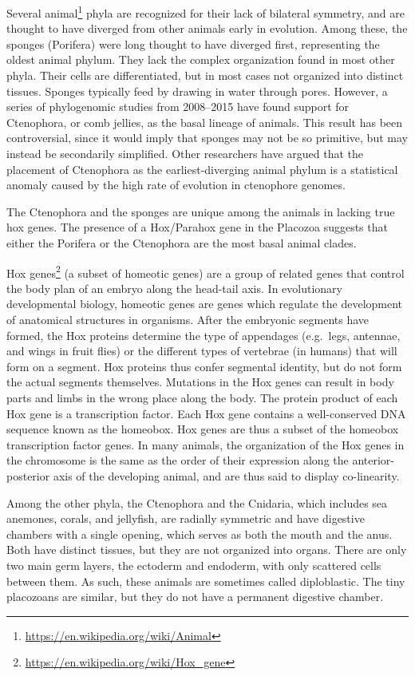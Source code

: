 \documentclass[]{book}
\let\rmarkdownfootnote\footnote%
\def\footnote{\protect\rmarkdownfootnote}
\renewcommand{\href}[2]{#2\footnote{\url{#1}}}
\theoremstyle{definition}
\theoremstyle{definition}
\theoremstyle{definition}
\theoremstyle{remark}
\begin{document}
\begin{enumerate}
Several \href{https://en.wikipedia.org/wiki/Animal}{animal} phyla are
recognized for their lack of bilateral symmetry, and are thought to have
diverged from other animals early in evolution. Among these, the sponges
(Porifera) were long thought to have diverged first, representing the
oldest animal phylum. They lack the complex organization found in most
other phyla. Their cells are differentiated, but in most cases not
organized into distinct tissues. Sponges typically feed by drawing in
water through pores. However, a series of phylogenomic studies from
2008--2015 have found support for Ctenophora, or comb jellies, as the
basal lineage of animals. This result has been controversial, since it
would imply that sponges may not be so primitive, but may instead be
secondarily simplified. Other researchers have argued that the placement
of Ctenophora as the earliest-diverging animal phylum is a statistical
anomaly caused by the high rate of evolution in ctenophore genomes.

The Ctenophora and the sponges are unique among the animals in lacking
true hox genes. The presence of a Hox/Parahox gene in the Placozoa
suggests that either the Porifera or the Ctenophora are the most basal
animal clades.

\href{https://en.wikipedia.org/wiki/Hox_gene}{Hox genes} (a subset of
homeotic genes) are a group of related genes that control the body plan
of an embryo along the head-tail axis. In evolutionary developmental
biology, homeotic genes are genes which regulate the development of
anatomical structures in organisms. After the embryonic segments have
formed, the Hox proteins determine the type of appendages (e.g.~legs,
antennae, and wings in fruit flies) or the different types of vertebrae
(in humans) that will form on a segment. Hox proteins thus confer
segmental identity, but do not form the actual segments themselves.
Mutations in the Hox genes can result in body parts and limbs in the
wrong place along the body. The protein product of each Hox gene is a
transcription factor. Each Hox gene contains a well-conserved DNA
sequence known as the homeobox. Hox genes are thus a subset of the
homeobox transcription factor genes. In many animals, the organization
of the Hox genes in the chromosome is the same as the order of their
expression along the anterior-posterior axis of the developing animal,
and are thus said to display co-linearity.

Among the other phyla, the Ctenophora and the Cnidaria, which includes
sea anemones, corals, and jellyfish, are radially symmetric and have
digestive chambers with a single opening, which serves as both the mouth
and the anus. Both have distinct tissues, but they are not organized
into organs. There are only two main germ layers, the ectoderm and
endoderm, with only scattered cells between them. As such, these animals
are sometimes called diploblastic. The tiny placozoans are similar, but
they do not have a permanent digestive chamber.


\end{enumerate}
\end{document}
